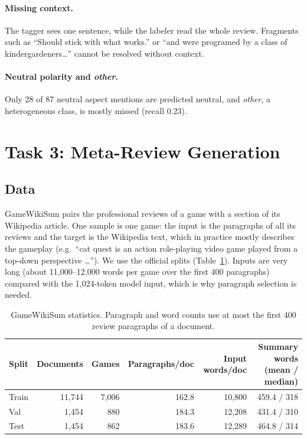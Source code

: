 \documentclass[11pt,a4paper]{article}
\begin{document}
\paragraph{Missing context.} The tagger sees one sentence, while the labeler read the whole
review. Fragments such as ``Should stick with what works.'' or ``and were programed by a class
of kindergardeners\dots'' cannot be resolved without context.

\paragraph{Neutral polarity and \emph{other}.} Only 28 of 87 neutral aspect mentions are
predicted neutral, and \emph{other}, a heterogeneous class, is mostly missed (recall 0.23).

\section{Task 3: Meta-Review Generation}
\label{sec:task3}

\subsection{Data}

GameWikiSum \citep{antognini2020gamewikisum} pairs the professional reviews of a game with a
section of its Wikipedia article. One sample is one game: the input is the paragraphs of all
its reviews and the target is the Wikipedia text, which in practice mostly describes the
gameplay (e.g.\ ``cat quest is an action role-playing video game played from a top-down
perspective \dots''). We use the official splits (Table~\ref{tab:t3data}). Inputs are very long
(about 11,000--12,000 words per game over the first 400 paragraphs) compared with the
1,024-token model input, which is why paragraph selection is needed.

\begin{table}[t]
  \centering
  \small
  \begin{tabular}{lrrrrr}
    \toprule
    Split & Documents & Games & Paragraphs/doc & Input words/doc & Summary words (mean / median) \\
    \midrule
    Train & 11,744 & 7,006 & 162.8 & 10,800 & 459.4 / 318 \\
    Val & 1,454 & 880 & 184.3 & 12,208 & 431.4 / 310 \\
    Test & 1,454 & 862 & 183.6 & 12,289 & 464.8 / 314 \\
    \bottomrule
  \end{tabular}
  \caption{GameWikiSum statistics. Paragraph and word counts use at most the first 400 review
  paragraphs of a document.}
  \label{tab:t3data}
\end{table}
\end{document}
